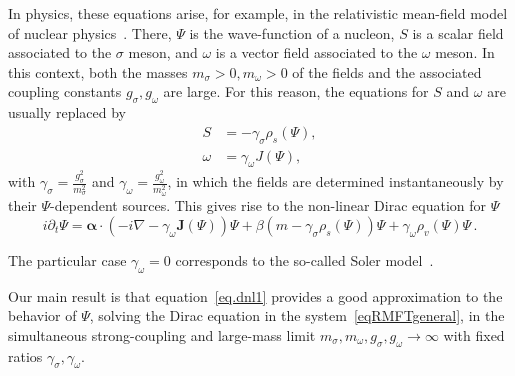 \documentclass[AHL,Unicode,longabstracts,published]{cedram}
\begin{document}
In physics, these equations arise, for example, in the relativistic mean-field model of nuclear physics~\cite{Ring-96}. There, $\Psi$ is the wave-function of a nucleon, $S$ is a scalar field associated to the $\sigma$ meson, and $\omega$ is a vector field associated to the $\omega$ meson. In this context, both the masses $m_\sigma>0, m_\omega>0$ of the fields and the associated coupling constants $g_\sigma, g_\omega$ are large. For this reason, the equations for $S$ and $\omega$ are usually replaced by
\begin{equation}\label{eq:instant}
\begin{split}
S&=-\gamma_\sigma \rho_s(\Psi), \\
\omega&=\gamma_\omega J(\Psi),
\end{split}
\end{equation}
with $\gamma_\sigma=\tfrac{g_\sigma^2}{m_\sigma^2}$ and $\gamma_\omega=\frac{g_\omega^2}{m_\omega^2}$, in which the fields are determined instantaneously by their $\Psi$-dependent sources. This gives rise to the non-linear Dirac equation for $\Psi$
\begin{equation}\label{eq.dnl1}
i\partial_t\Psi = \bm \alpha\cdot\left(-i\nabla-\gamma_\omega {\bm J}(\Psi)
\right)\Psi +\beta\left(m - \gamma_\sigma \rho_s(\Psi) \right)\Psi +\gamma_\omega\rho_v(\Psi)\Psi
\,.
\end{equation}

The particular case $\gamma_\omega=0$ corresponds to the so-called Soler model~\cite{CazVaz-86,Soler-70}.

Our main result is that equation~\eqref{eq.dnl1} provides a good approximation to the behavior of $\Psi$, solving the Dirac equation in the system~\eqref{eqRMFTgeneral}, in the simultaneous strong-coupling and large-mass limit $m_\sigma, m_\omega, g_\sigma, g_\omega \to \infty$ with fixed ratios $\gamma_\sigma, \gamma_\omega$.
\end{document}

